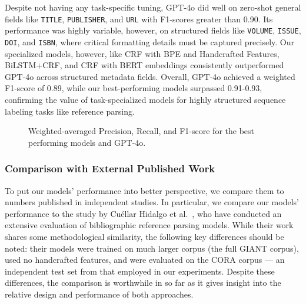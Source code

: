 Despite not having any task-specific tuning, GPT-4o did well on zero-shot general fields like \texttt{TITLE}, \texttt{PUBLISHER}, and \texttt{URL} with F1-scores greater than 0.90. Its performance was highly variable, however, on structured fields like \texttt{VOLUME}, \texttt{ISSUE}, \texttt{DOI}, and \texttt{ISBN}, where critical formatting details must be captured precisely. Our specialized models, however, like CRF with BPE and Handcrafted Features, BiLSTM+CRF, and CRF with BERT embeddings consistently outperformed GPT-4o across structured metadata fields. Overall, GPT-4o achieved a weighted F1-score of 0.89, while our best-performing models surpassed 0.91-0.93, confirming the value of task-specialized models for highly structured sequence labeling tasks like reference parsing.
\begin{figure}[H]
    \centering
    
    \caption[Comparison of Best Models and GPT-4o]{Weighted-averaged Precision, Recall, and F1-score for the best performing models and GPT-4o.}
    \label{fig:comparison_gpt4o}
\end{figure}

\subsubsection{Comparison with External Published Work}
To put our models' performance into better perspective, we compare them to numbers published in independent studies. In particular, we compare our models' performance to the study by Cuéllar Hidalgo et al.~\cite{ArchComapre}, who have conducted an extensive evaluation of bibliographic reference parsing models. While their work shares some methodological similarity, the following key differences should be noted: their models were trained on much larger corpus (the full GIANT corpus), used no handcrafted features, and were evaluated on the CORA corpus — an independent test set from that employed in our experiments. Despite these differences, the comparison is worthwhile in so far as it gives insight into the relative design and performance of both approaches.

